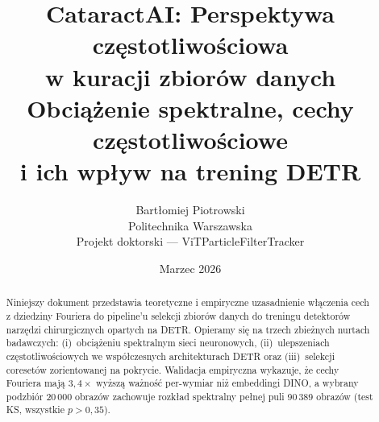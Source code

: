 \documentclass[11pt,a4paper]{article}
\title{\textbf{CataractAI: Perspektywa częstotliwościowa\\
       w kuracji zbiorów danych}\\[0.5em]
       \large Obciążenie spektralne, cechy częstotliwościowe\\
       i ich wpływ na trening DETR}
\author{Bartłomiej Piotrowski\\
        \small Politechnika Warszawska\\
        \small Projekt doktorski --- ViTParticleFilterTracker}
\date{Marzec 2026}
\begin{document}
\maketitle

\begin{abstract}
Niniejszy dokument przedstawia teoretyczne i empiryczne uzasadnienie
włączenia cech z dziedziny Fouriera do pipeline'u selekcji zbiorów danych
do treningu detektorów narzędzi chirurgicznych opartych na DETR.  Opieramy
się na trzech zbieżnych nurtach badawczych: (i)~obciążeniu spektralnym sieci
neuronowych, (ii)~ulepszeniach częstotliwościowych we współczesnych
architekturach DETR oraz (iii)~selekcji coresetów zorientowanej na pokrycie.
Walidacja empiryczna wykazuje, że cechy Fouriera mają $3{,}4\times$ wyższą
ważność per-wymiar niż embeddingi DINO, a wybrany podzbiór 20\,000 obrazów
zachowuje rozkład spektralny pełnej puli 90\,389 obrazów (test KS,
wszystkie $p > 0{,}35$).
\end{abstract}

\tableofcontents
\newpage





\newpage


\end{document}
